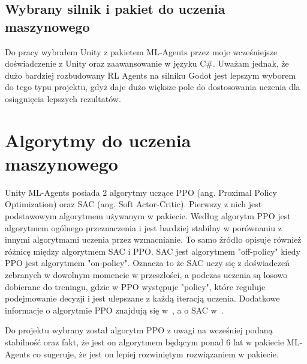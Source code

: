 \documentclass{SGGW-thesis}
\begin{document}
\subsection*{Wybrany silnik i pakiet do uczenia maszynowego}
Do pracy wybrałem Unity z pakietem ML-Agents przez moje wcześniejsze doświadczenie z Unity oraz zaawansowanie w języku C\#. Uważam jednak, że dużo bardziej rozbudowany RL Agents na silniku Godot jest lepszym wyborem do tego typu projektu, gdyż daje dużo większe pole do dostosowania uczenia dla osiągnięcia lepszych rezultatów.


\section{Algorytmy do uczenia maszynowego}
\label{algorithms}
Unity ML-Agents posiada 2 algorytmy uczące PPO (ang. Proximal Policy Optimization) oraz SAC (ang. Soft Actor-Critic). Pierwszy z nich jest podstawowym algorytmem używanym w pakiecie. Według \cite{MLAgentsDocs} algorytm PPO jest algorytmem ogólnego przeznaczenia i jest bardziej stabilny w porównaniu z innymi algorytmami uczenia przez wzmacnianie.
To samo źródło opisuje również różnicę między algorytmem SAC i PPO. SAC jest algorytmem "off-policy" kiedy PPO jest algorytmem "on-policy". Oznacza to że SAC uczy się z doświadczeń zebranych w dowolnym momencie w przeszłości, a podczas uczenia są losowo dobierane do treningu, gdzie w PPO występuje "policy",
które reguluje podejmowanie decyzji i jest ulepszane z każdą iteracją uczenia. Dodatkowe informacje o algorytmie PPO znajdują się w~\cite{PPOArticle}, a o SAC w~\cite{SACArticle}. 

\pagebreak
Do projektu wybrany został algorytm PPO z uwagi na wcześniej podaną stabilność oraz fakt, że jest on algorytmem będącym ponad 6 lat w pakiecie ML-Agents co sugeruje, że jest on lepiej rozwiniętym rozwiązaniem w pakiecie.
\end{document}
